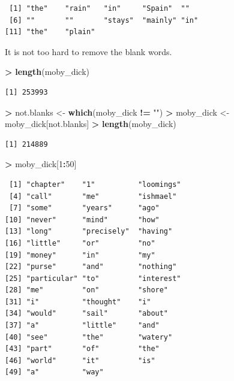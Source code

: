 \documentclass[
]{krantz}
\makeatletter
\newenvironment{Shaded}{\begin{snugshade}}{\end{snugshade}}
\newcommand{\DecValTok}[1]{\textcolor[rgb]{0.06,0.06,0.06}{#1}}
\newcommand{\KeywordTok}[1]{\textcolor[rgb]{0.27,0.27,0.27}{\textbf{#1}}}
\newcommand{\NormalTok}[1]{#1}
\newcommand{\OperatorTok}[1]{\textcolor[rgb]{0.43,0.43,0.43}{\textbf{#1}}}
\newcommand{\StringTok}[1]{\textcolor[rgb]{0.5,0.5,0.5}{#1}}
\newenvironment{kframe}{%
\medskip{}
\setlength{\fboxsep}{.8em}
 \def\at@end@of@kframe{}%
 \ifinner\ifhmode%
  \def\at@end@of@kframe{\end{minipage}}%
  \begin{minipage}{\columnwidth}%
 \fi\fi%
 \def\FrameCommand##1{\hskip\@totalleftmargin \hskip-\fboxsep
 \colorbox{shadecolor}{##1}\hskip-\fboxsep
     \hskip-\linewidth \hskip-\@totalleftmargin \hskip\columnwidth}%
 \MakeFramed {\advance\hsize-\width
   \@totalleftmargin\z@ \linewidth\hsize
   \@setminipage}}%
 {\par\unskip\endMakeFramed%
 \at@end@of@kframe}
\renewenvironment{Shaded}{\begin{kframe}}{\end{kframe}}
\makeatother
\begin{document}
\begin{verbatim}
 [1] "the"    "rain"   "in"     "Spain"  ""      
 [6] ""       ""       "stays"  "mainly" "in"    
[11] "the"    "plain" 
\end{verbatim}

It is not too hard to remove the blank words.

\begin{Shaded}
\begin{Highlighting}[]
\OperatorTok{\textgreater{}}\StringTok{ }\KeywordTok{length}\NormalTok{(moby\_dick)}
\end{Highlighting}
\end{Shaded}

\begin{verbatim}
[1] 253993
\end{verbatim}

\begin{Shaded}
\begin{Highlighting}[]
\OperatorTok{\textgreater{}}\StringTok{ }\NormalTok{not.blanks \textless{}{-}}\StringTok{ }\KeywordTok{which}\NormalTok{(moby\_dick }\OperatorTok{!=}\StringTok{ ""}\NormalTok{)}
\OperatorTok{\textgreater{}}\StringTok{ }\NormalTok{moby\_dick \textless{}{-}}\StringTok{ }\NormalTok{moby\_dick[not.blanks]}
\OperatorTok{\textgreater{}}\StringTok{ }\KeywordTok{length}\NormalTok{(moby\_dick)}
\end{Highlighting}
\end{Shaded}

\begin{verbatim}
[1] 214889
\end{verbatim}

\begin{Shaded}
\begin{Highlighting}[]
\OperatorTok{\textgreater{}}\StringTok{ }\NormalTok{moby\_dick[}\DecValTok{1}\OperatorTok{:}\DecValTok{50}\NormalTok{]}
\end{Highlighting}
\end{Shaded}

\begin{verbatim}
 [1] "chapter"    "1"          "loomings"  
 [4] "call"       "me"         "ishmael"   
 [7] "some"       "years"      "ago"       
[10] "never"      "mind"       "how"       
[13] "long"       "precisely"  "having"    
[16] "little"     "or"         "no"        
[19] "money"      "in"         "my"        
[22] "purse"      "and"        "nothing"   
[25] "particular" "to"         "interest"  
[28] "me"         "on"         "shore"     
[31] "i"          "thought"    "i"         
[34] "would"      "sail"       "about"     
[37] "a"          "little"     "and"       
[40] "see"        "the"        "watery"    
[43] "part"       "of"         "the"       
[46] "world"      "it"         "is"        
[49] "a"          "way"       
\end{verbatim}
\end{document}
